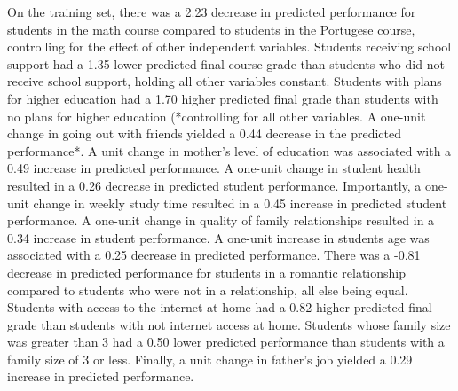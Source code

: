 On the training set, there was a 2.23 decrease in predicted performance 
for students in the math course compared to students in the Portugese course, 
controlling for the effect of other independent variables. Students receiving 
school support had a 1.35 lower predicted final course grade than students 
who did not receive school support, holding all other variables constant. 
Students with plans for higher education had a 1.70 higher predicted final 
grade than students with no plans for higher education (*controlling for 
all other variables. A one-unit change in going out with friends yielded 
a 0.44 decrease in the predicted performance*. A unit change in mother's 
level of education was associated with a 0.49 increase in predicted performance.
A one-unit change in student health resulted in a 0.26 decrease in predicted 
student performance. Importantly, a one-unit change in weekly study time 
resulted in a 0.45 increase in predicted student performance. A one-unit 
change in quality of family relationships resulted in a 0.34 increase in 
student performance. A one-unit increase in students age was associated with
a 0.25 decrease in predicted performance. There was a -0.81 decrease in 
predicted performance for students in a romantic relationship compared to 
students who were not in a relationship, all else being equal. Students with 
access to the internet at home had a 0.82 higher predicted final grade than 
students with not internet access at home. Students whose family size was
greater than 3 had a 0.50 lower predicted performance than students with 
a family size of 3 or less. Finally, a unit change in father's job yielded 
a 0.29 increase in predicted performance. 



